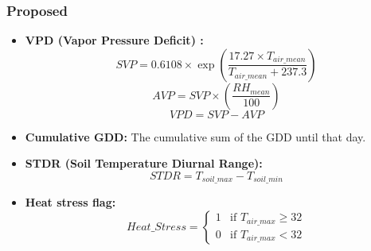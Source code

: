 \documentclass[conference]{IEEEtran}
\begin{document}
\subsubsection{Proposed}
\begin{itemize}
    \item \textbf{VPD (Vapor Pressure Deficit) \cite{vpd}:}
    \begin{equation}
    SVP = 0.6108 \times \exp \left( \frac{17.27 \times T_{air\_mean}}{T_{air\_mean} + 237.3} \right)
    \end{equation}
    \begin{equation}
    AVP = SVP \times \left( \frac{RH_{mean}}{100} \right)
    \end{equation}
    \begin{equation}
    VPD = SVP - AVP
    \end{equation}
    
    \item \textbf{Cumulative GDD:} The cumulative sum of the GDD until that day.
    
    \item \textbf{STDR (Soil Temperature Diurnal Range):}
    \begin{equation}
    STDR = T_{soil\_max} - T_{soil\_min}
    \end{equation}
    
    \item \textbf{Heat stress flag:}
    \begin{equation}
    Heat\_Stress = 
    \begin{cases} 
    1 & \text{if } T_{air\_max} \ge 32 \\ 
    0 & \text{if } T_{air\_max} < 32 
    \end{cases}
    \end{equation}
\end{itemize}
\end{document}

